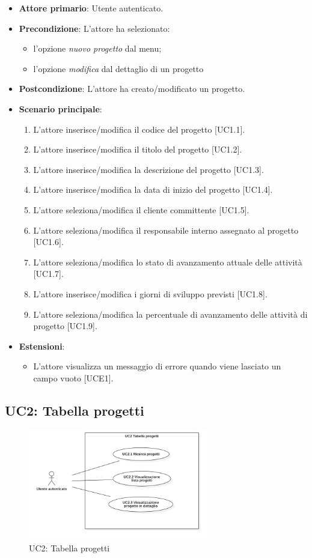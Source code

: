 \begin{itemize}
\item \textbf{Attore primario}: Utente autenticato.
\item \textbf{Precondizione}: L'attore ha selezionato: 
\begin{itemize}
\item l'opzione \textit{nuovo progetto} dal menu;
\item l'opzione \textit{modifica} dal dettaglio di un progetto
\end{itemize}
\item \textbf{Postcondizione}: L'attore ha creato/modificato un progetto.
\item \textbf{Scenario principale}: 
\begin{enumerate}
\item L'attore inserisce/modifica il codice del progetto [UC1.1].
\item L'attore inserisce/modifica il titolo del progetto [UC1.2].
\item L'attore inserisce/modifica la descrizione del progetto [UC1.3].
\item L'attore inserisce/modifica la data di inizio del progetto [UC1.4].
\item L'attore seleziona/modifica il cliente committente [UC1.5].
\item L'attore seleziona/modifica il responsabile interno assegnato al progetto [UC1.6].
\item L'attore seleziona/modifica lo stato di avanzamento attuale delle attività [UC1.7].
\item L'attore inserisce/modifica i giorni di sviluppo previsti [UC1.8].
\item L'attore seleziona/modifica la percentuale di avanzamento delle attività di progetto [UC1.9].
\end{enumerate}
\item \textbf{Estensioni}: 
\begin{itemize}
\item L'attore visualizza un messaggio di errore quando viene lasciato un campo vuoto [UCE1].
\end{itemize} 
\end{itemize}

\pagebreak

\subsection{UC2: Tabella progetti}
\begin{figure}[!h]
\centering
\includegraphics[width=300px]{../images/UC/.jpeg/UC2.0-tabellaProgetti.jpg}
\caption{UC2: Tabella progetti}
\end{figure}

